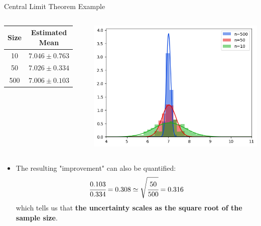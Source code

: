 \documentclass{beamer}
\begin{document}
\begin{frame}[fragile]{Central Limit Theorem Example}
\begin{columns}
         \begin{table}
            \centering
            \begin{tabular}{cc}
                Size & Estimated Mean \\
                \hline
                10 & $7.046 \pm 0.763$\\
                50 & $7.026 \pm 0.334$ \\
                500 & $7.006 \pm 0.103$ \\
            \end{tabular}
            \label{tab:my_label}
        \end{table}
        \includegraphics[width=0.8\linewidth]{images/sample_mean}
\end{columns}
\begin{itemize}
    \item The resulting "improvement" can also be quantified:
    \begin{equation}
    \cfrac{0.103}{0.334} = 0.308 \simeq \sqrt{\cfrac{50}{500}} = 0.316
    \label{eq:clt}
    \end{equation}
    which tells us that \textbf{the uncertainty scales as the square root of the sample size}.
\end{itemize}
\end{frame}
\end{document}
